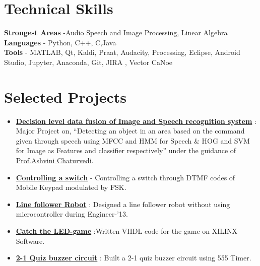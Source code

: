 \documentclass[margin, centered]{res}
\begin{document}
\begin{resume}
\section{Technical \hspace{2mm} Skills}
\textbf{Strongest Areas} -Audio Speech and Image Processing, Linear Algebra \\
\textbf{Languages} - Python, C++, C,Java\\
\textbf{Tools} - MATLAB, Qt, Kaldi, Praat, Audacity, Processing, Eclipse, Android Studio, Jupyter, Anaconda, Git, JIRA , Vector CaNoe

\section{Selected Projects}
\begin{itemize}[leftmargin=*]
 \item \textbf{\href{https://github.com/nithinraok/Decision-level-data-fusion-of-Image-and-Speech-recognition-system}{Decision level data fusion of Image and Speech recognition system}} : Major Project on, “Detecting an object in an area based on the command given through speech using MFCC and HMM for Speech \& HOG and SVM for Image as Features and classifier respectively” under the guidance of \href{http://ece.nitk.ac.in/professor/ashvini-chaturvedi}{Prof.\hspace{2mm}Ashvini Chaturvedi}.
 \item \textbf{\href{}{Controlling a switch}} - Controlling a switch through DTMF codes of Mobile Keypad modulated by FSK.
 \item \textbf{\href{}{Line follower Robot}} : Designed a line follower robot without using microcontroller during Engineer-’13.
 \item \textbf{\href{}{Catch the LED-game}} :Written VHDL code for the game on XILINX Software.
 \item \textbf{\href{}{2-1 Quiz buzzer circuit}} : Built a 2-1 quiz buzzer circuit using 555 Timer.
\end{itemize}



\end{resume}
\end{document}
